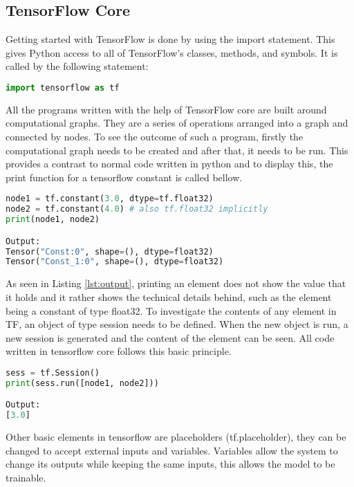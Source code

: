 \subsection{TensorFlow Core}
Getting started with TensorFlow is done by using the import statement. 
This gives Python access to all of TensorFlow's classes,
methods, and symbols. It is called by the following statement:
\begin{lstlisting}[language=Python, flexiblecolumns=true, caption=Importing Tensorflow library.]
import tensorflow as tf
\end{lstlisting}
All the programs written with the help of TensorFlow core are built around computational graphs. 
They are a series of operations arranged into a graph and connected by nodes. 
To see the outcome of such a program, 
firstly the computational graph needs to be created and after that, it needs to be run. 
This provides a contrast to normal code written in python and to display this, 
the print function for a tensorflow constant is called bellow.
\begin{lstlisting}[language=Python, flexiblecolumns=true, label={lst:output}, caption=Printing output without sess.run().]
node1 = tf.constant(3.0, dtype=tf.float32)
node2 = tf.constant(4.0) # also tf.float32 implicitly
print(node1, node2)

Output:
Tensor("Const:0", shape=(), dtype=float32)
Tensor("Const_1:0", shape=(), dtype=float32) 
\end{lstlisting}
As seen in Listing \ref{lst:output}, printing an element does not show the value that it holds and it rather shows the technical details behind,
such as the element being a constant of type float32.
To investigate the contents of any element in TF,
an object of type session needs to be defined.
When the new object is run, a new session is generated and the content of the element can be seen.
All code written in tensorflow core follows this basic principle.
\begin{lstlisting}[language=Python, flexiblecolumns=true, caption=Printing output with sess.run().]
sess = tf.Session()
print(sess.run([node1, node2]))

Output:
[3.0]
\end{lstlisting}
Other basic elements in tensorflow are
placeholders (tf.placeholder), they can be changed to accept external inputs and variables. Variables allow the system to
change its outputs while keeping the same inputs,
this allows the model to be trainable. 

